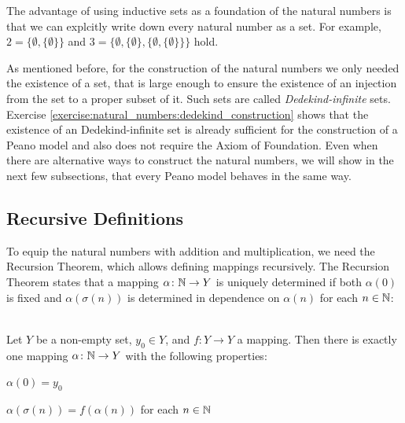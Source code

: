 The advantage of using inductive sets as a foundation of the natural numbers is that we can explcitly write down every natural number as a set. For example, $2=\{\emptyset,\{\emptyset\}\}$ and $3=\{\emptyset,\{\emptyset\},\{\emptyset,\{\emptyset\}\}\}$ hold.

As mentioned before, for the construction of the natural numbers we only needed the existence of a set, that is large enough to ensure the existence of an injection from the set to a proper subset of it. Such sets are called \emph{Dedekind-infinite} sets. Exercise \ref{exercise:natural_numbers:dedekind_construction} shows that the existence of an Dedekind-infinite set is already sufficient for the construction of a Peano model and also does not require the Axiom of Foundation. Even when there are alternative ways to construct the natural numbers, we will show in the next few subsections, that every Peano model behaves in the same way.

\subsection{Recursive Definitions}

To equip the natural numbers with addition and multiplication, we need the Recursion Theorem, which allows defining mappings recursively.
The Recursion Theorem states that a mapping $\alpha\colon\mathbb{N}\rightarrow Y$ is uniquely determined if both $\alpha(0)$ is fixed and $\alpha(\sigma(n))$ is determined in dependence on $\alpha(n)$ for each $n\in\mathbb{N}$:

\begin{theorem}\label{theorem:natural_numbers:recursion_theorem}~\\
    Let $Y$ be a non-empty set, $y_0\in Y$, and $f\colon Y\rightarrow Y$ a mapping.
    Then there is exactly one mapping $\alpha\colon\mathbb{N}\rightarrow Y$ with the following properties:
    \begin{intheoremenumerate}
        \item $\alpha(0)=y_0$
        \item $\alpha(\sigma(n))=f(\alpha(n))$ for each $n\in\mathbb{N}$
    \end{intheoremenumerate}
\end{theorem}

